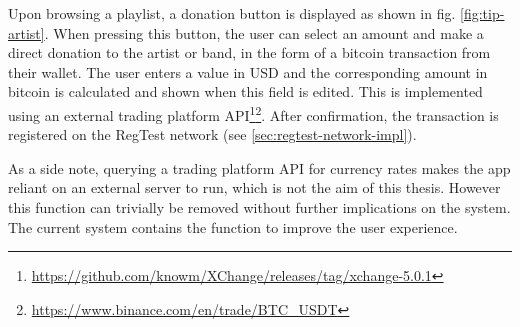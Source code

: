 Upon browsing a playlist, a donation button is displayed as shown in fig. \ref{fig:tip-artist}. When pressing this button, the user can select an amount and make a direct donation to the artist or band, in the form of a bitcoin transaction from their wallet. The user enters a value in USD and the corresponding amount in bitcoin is calculated and shown when this field is edited. This is implemented using an external trading platform API\footnote{\url{https://github.com/knowm/XChange/releases/tag/xchange-5.0.1}}\footnote{\url{https://www.binance.com/en/trade/BTC_USDT}}. After confirmation, the transaction is registered on the RegTest network (see \ref{sec:regtest-network-impl}). 

As a side note, querying a trading platform API for currency rates makes the app reliant on an external server to run, which is not the aim of this thesis. However this function can trivially be removed without further implications on the system. The current system contains the function to improve the user experience.
